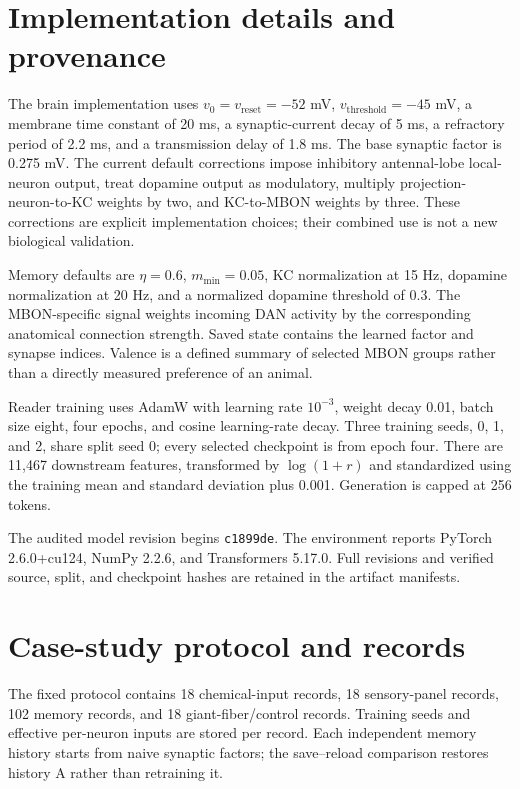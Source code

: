 \section{Implementation details and provenance}
\label{app:methods}
The brain implementation uses $v_0=v_{\mathrm{reset}}=-52$ mV, $v_{\mathrm{threshold}}=-45$ mV, a membrane time constant of 20 ms, a synaptic-current decay of 5 ms, a refractory period of 2.2 ms, and a transmission delay of 1.8 ms. The base synaptic factor is 0.275 mV. The current default corrections impose inhibitory antennal-lobe local-neuron output, treat dopamine output as modulatory, multiply projection-neuron-to-KC weights by two, and KC-to-MBON weights by three. These corrections are explicit implementation choices; their combined use is not a new biological validation.

Memory defaults are $\eta=0.6$, $m_{\min}=0.05$, KC normalization at 15 Hz, dopamine normalization at 20 Hz, and a normalized dopamine threshold of 0.3. The MBON-specific signal weights incoming DAN activity by the corresponding anatomical connection strength. Saved state contains the learned factor and synapse indices. Valence is a defined summary of selected MBON groups rather than a directly measured preference of an animal.

Reader training uses AdamW with learning rate $10^{-3}$, weight decay 0.01, batch size eight, four epochs, and cosine learning-rate decay. Three training seeds, 0, 1, and 2, share split seed 0; every selected checkpoint is from epoch four. There are 11,467 downstream features, transformed by $\log(1+r)$ and standardized using the training mean and standard deviation plus 0.001. Generation is capped at 256 tokens.

The audited model revision begins \texttt{c1899de}. The environment reports PyTorch 2.6.0+cu124, NumPy 2.2.6, and Transformers 5.17.0. Full revisions and verified source, split, and checkpoint hashes are retained in the artifact manifests.

\section{Case-study protocol and records}
The fixed protocol contains 18 chemical-input records, 18 sensory-panel records, 102 memory records, and 18 giant-fiber/control records. Training seeds and effective per-neuron inputs are stored per record. Each independent memory history starts from naive synaptic factors; the save--reload comparison restores history A rather than retraining it.

